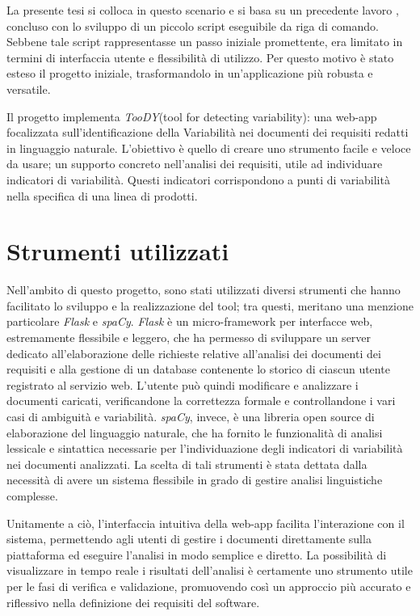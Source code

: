 \documentclass[12pt]{report}
\newcommand{\toody}{\textsl{TooDY}\xspace}
\newcommand{\flask}{\textsl{Flask}\xspace}
\newcommand{\spacy}{\textsl{spaCy}\xspace}
\begin{document}
La presente tesi si colloca in questo scenario e si basa su un precedente lavoro \cite{livi}, concluso con lo sviluppo di un piccolo script eseguibile da riga di comando. Sebbene tale script rappresentasse un passo iniziale promettente, era limitato in termini di interfaccia utente e flessibilità di utilizzo. Per questo motivo è stato esteso il progetto iniziale, trasformandolo in un'applicazione più robusta e versatile.

Il progetto implementa \toody (tool for detecting variability): una web-app focalizzata sull’identificazione della \textsf{Variabilità} nei documenti dei requisiti redatti in linguaggio naturale. L’obiettivo è quello di creare uno strumento facile e veloce da usare; un supporto concreto nell’analisi dei requisiti, utile ad individuare indicatori di variabilità. Questi indicatori corrispondono a punti di variabilità nella specifica di una linea di prodotti.


\section{Strumenti utilizzati}
Nell’ambito di questo progetto, sono stati utilizzati diversi strumenti che hanno facilitato lo sviluppo e la realizzazione del tool; tra questi, meritano una menzione particolare \flask e \spacy. \flask è un micro-framework per interfacce web, estremamente flessibile e leggero, che ha permesso di sviluppare un server dedicato all’elaborazione delle richieste relative all’analisi dei documenti dei requisiti e alla gestione di un database contenente lo storico di ciascun utente registrato al servizio web. L'utente può quindi modificare e analizzare i documenti caricati, verificandone la correttezza formale e controllandone i vari casi di ambiguità e variabilità. \spacy, invece, è una libreria open source di elaborazione del linguaggio naturale, che ha fornito le funzionalità di analisi lessicale e sintattica necessarie per l’individuazione degli indicatori di variabilità nei documenti analizzati. La scelta di tali strumenti è stata dettata dalla necessità di avere un sistema flessibile in grado di gestire analisi linguistiche complesse.

Unitamente a ciò, l'interfaccia intuitiva della web-app facilita l'interazione con il sistema, permettendo agli utenti di gestire i documenti direttamente sulla piattaforma ed eseguire l'analisi in modo semplice e diretto. La possibilità di visualizzare in tempo reale i risultati dell'analisi è certamente uno strumento utile per le fasi di verifica e validazione, promuovendo così un approccio più accurato e riflessivo nella definizione dei requisiti del software.
\end{document}
